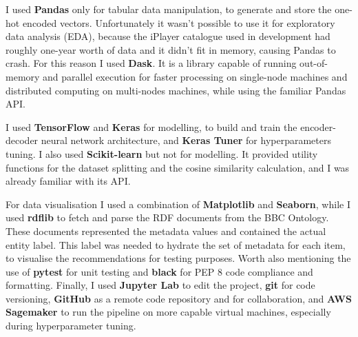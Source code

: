 I used \textbf{Pandas} only for tabular data manipulation, to generate and store the one-hot encoded vectors. Unfortunately it wasn't possible
to use it for exploratory data analysis (EDA), because the iPlayer catalogue used in development had roughly one-year worth of data and it didn't
fit in memory, causing Pandas to crash. For this reason I used \textbf{Dask}. It is a library capable of running out-of-memory and
parallel execution for faster processing on single-node machines and distributed computing on multi-nodes machines, while using the familiar Pandas API.

I used \textbf{TensorFlow} and \textbf{Keras} for modelling, to build and train the encoder-decoder neural network architecture,
and \textbf{Keras Tuner} for
hyperparameters tuning. I also used \textbf{Scikit-learn} but not for modelling. It provided utility functions for the dataset splitting and
the cosine similarity calculation, and I was already familiar with its API.

For data visualisation I used a combination of \textbf{Matplotlib} and \textbf{Seaborn}, while I used \textbf{rdflib} to fetch and parse
the RDF documents from the BBC Ontology. These documents represented the metadata values and contained the actual entity label.
This label was needed to hydrate the set of metadata for each item, to visualise the recommendations for testing purposes.
Worth also mentioning the use of \textbf{pytest} for unit testing and \textbf{black} for PEP 8 code compliance and formatting.
Finally, I used \textbf{Jupyter Lab} to edit the project, \textbf{git} for code versioning, \textbf{GitHub} as a remote code repository
and for collaboration, and \textbf{AWS Sagemaker} to run the pipeline on more capable virtual machines, especially during hyperparameter tuning.
